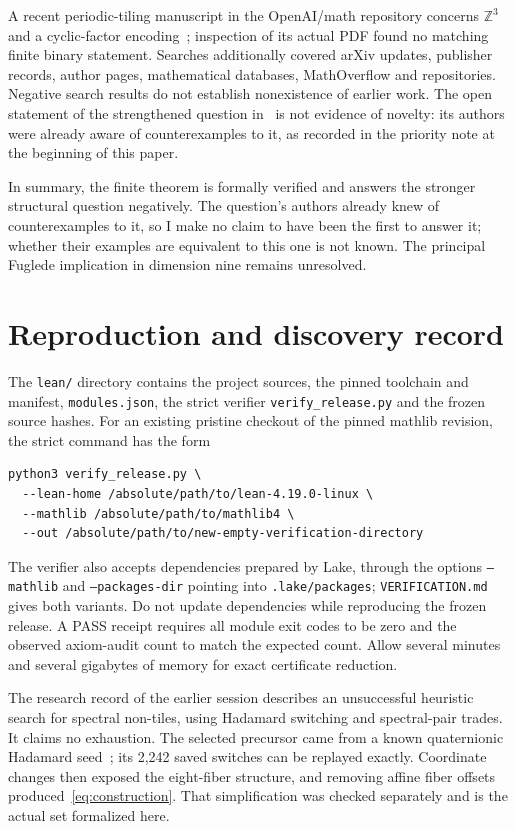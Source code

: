 \documentclass[11pt]{article}
\theoremstyle{definition}\newtheorem{definition}[theorem]{Definition}
\theoremstyle{remark}\newtheorem{remark}[theorem]{Remark}
\newcommand{\code}[1]{\texttt{\small #1}}
\begin{document}
A recent periodic-tiling manuscript in the OpenAI/math repository concerns $\mathbb Z^3$ and a cyclic-factor encoding~\cite{oaitiling}; inspection of its actual PDF found no matching finite binary statement. Searches additionally covered arXiv updates, publisher records, author pages, mathematical databases, MathOverflow and repositories. Negative search results do not establish nonexistence of earlier work. The open statement of the strengthened question in~\cite{fi8} is not evidence of novelty: its authors were already aware of counterexamples to it, as recorded in the priority note at the beginning of this paper.

In summary, the finite theorem is formally verified and answers the stronger structural question negatively. The question's authors already knew of counterexamples to it, so I make no claim to have been the first to answer it; whether their examples are equivalent to this one is not known. The principal Fuglede implication in dimension nine remains unresolved.

\section{Reproduction and discovery record}

The \code{lean/} directory contains the project sources, the pinned toolchain and manifest, \code{modules.json}, the strict verifier \code{verify\_release.py} and the frozen source hashes. For an existing pristine checkout of the pinned mathlib revision, the strict command has the form
\begin{Verbatim}[fontsize=\small]
python3 verify_release.py \
  --lean-home /absolute/path/to/lean-4.19.0-linux \
  --mathlib /absolute/path/to/mathlib4 \
  --out /absolute/path/to/new-empty-verification-directory
\end{Verbatim}
The verifier also accepts dependencies prepared by Lake, through the options \code{--mathlib} and \code{--packages-dir} pointing into \code{.lake/packages}; \code{VERIFICATION.md} gives both variants. Do not update dependencies while reproducing the frozen release. A PASS receipt requires all module exit codes to be zero and the observed axiom-audit count to match the expected count. Allow several minutes and several gigabytes of memory for exact certificate reduction.

The research record of the earlier session describes an unsuccessful heuristic search for spectral non-tiles, using Hadamard switching and spectral-pair trades. It claims no exhaustion. The selected precursor came from a known quaternionic Hadamard seed~\cite{mr}; its 2,242 saved switches can be replayed exactly. Coordinate changes then exposed the eight-fiber structure, and removing affine fiber offsets produced~\eqref{eq:construction}. That simplification was checked separately and is the actual set formalized here.
\end{document}
